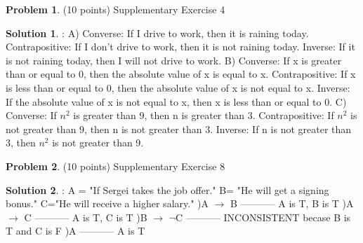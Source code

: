 \documentclass{article}
\theoremstyle{definition}
\newtheorem{problem}{Problem}
\newtheorem*{solution}{Solution}
\begin{document}
\begin{problem} (10 points) 
Supplementary Exercise 4
\end{problem}
\begin{solution}:
\newline 
A) Converse: If I drive to work, then it is raining today. 
\newline
Contrapositive: If I don't drive to work, then it is not raining today.
\newline
Inverse: If it is not raining today, then I will not drive to work.
\newline
B) Converse: If x is greater than or equal to 0, then the absolute value of x is equal to x.
\newline
Contrapositive: If x is less than or equal to 0, then the absolute value of x is not equal to x.
\newline
Inverse: If the absolute value of x is not equal to x, then x is less than or equal to 0.
\newline
C) Converse: If $n^2$ is greater than 9, then n is greater than 3.
\newline
Contrapositive: If $n^2$ is not greater than 9, then n is not greater than 3.
\newline
Inverse: If n is not greater than 3, then $n^2$ is not greater than 9.
\newline

\end{solution}

\newpage

\begin{problem} (10 points) 
Supplementary Exercise 8
\end{problem}
\begin{solution}:
\newline
A = "If Sergei takes the job offer."
\newline
B= "He will get a signing bonus."
\newline
C="He will receive a higher salary."
)A $\to$ B ----------- A is T, B is T
)A $\to$ C ----------- A is T, C is T		
)B $\to$ $\neg$C ----------- INCONSISTENT becase B is T and C is F 
)A  ----------- A is T
\end{solution}

\newpage
\end{document}
